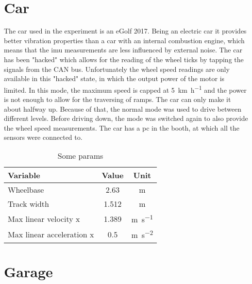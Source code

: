 \section{Car}
The car used in the experiment is an eGolf 2017.
Being an electric car it provides better vibration properties than a car with an internal combustion engine, which means that the \gls{imu} measurements are less influenced by external noise.
The car has been "hacked" which allows for the reading of the wheel ticks by tapping the signals from the CAN bus.
Unfortunately the wheel speed readings are only available in this "hacked" state, in which the output power of the motor is limited.
In this mode, the maximum speed is capped at \SI{5}{\kilo\metre\per\hour} and the power is not enough to allow for the traversing of ramps.
The car can only make it about halfway up.
Because of that, the normal mode was used to drive between different levels.
Before driving down, the mode was switched again to also provide the wheel speed measurements.
The car has a pc in the booth, at which all the sensors were connected to.
\begin{table}[htbp]
	\centering
	\caption{Some params}
	\label{tab:car_parameters}
	\begin{tabular}[t]{lcc}
		\toprule
		\textbf{Variable}         & \textbf{Value} & \textbf{Unit}                  \\
		\midrule
		Wheelbase                 & 2.63           & \si{\metre}                    \\
		Track width               & 1.512          & \si{\metre}                    \\
		Max linear velocity x     & 1.389          & \si{\metre\per\second}         \\
		Max linear acceleration x & 0.5            & \si{\metre\per\second\squared} \\
		\bottomrule
	\end{tabular}
\end{table}



\section{Garage}
